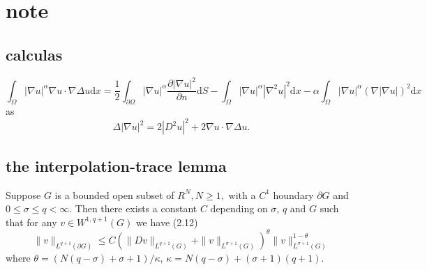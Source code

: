 
\chapter{note}
\section{calculas}
\begin{equation}
	\int_\Omega |\nabla u|^\alpha \nabla u \cdot \nabla\Delta u\mathrm{d}x = \frac{1}{2}\int_{\partial \Omega} |\nabla u|^\alpha \frac{\partial |\nabla u|^2}{\partial n}\mathrm{d}S - \int_\Omega |\nabla u|^\alpha |\nabla^2u|^2\mathrm{d}x - \alpha \int_\Omega |\nabla u|^\alpha (\nabla |\nabla u|)^2\mathrm{d}x
\end{equation}
as \begin{equation}
	\nonumber
	\Delta|\nabla u|^2 = 2|D^2u|^2 + 2\nabla u \cdot \nabla \Delta u.
\end{equation}

\section{the interpolation-trace lemma}
\begin{lemma}
	\cite{Diaz1985}
	\label{the interpolation-trace lemma}
	Suppose $G$ is a bounded open subset of $R^{N}, N \geq 1,$ with a $C^{1}$ houndary $\partial G$ and $0 \leq \sigma \leq q<\infty .$ Then there exists a constant $C$ depending on $\sigma$, $q$ and $G$ such that for any $v \in W^{1, q+1}(G)$ we have
(2.12)
\begin{equation*}
	\|v\|_{L^{q+1}(\partial G)} \leq C\left(\|D v\|_{L^{q+1}(G)}+\|v\|_{L^{\sigma+1}(G)}\right)^{\theta}\|v\|_{L^{\sigma+1}(G)}^{1-\theta}
\end{equation*}
where $\theta=(N(q-\sigma)+\sigma+1) / \kappa$, \(\kappa=N(q-\sigma)+(\sigma+1)(q+1)\).

\end{lemma}

